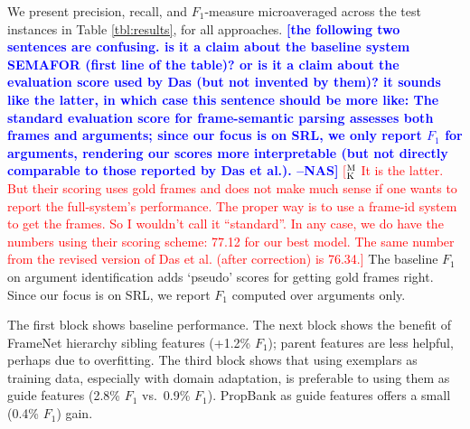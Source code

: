 \documentclass[11pt,a4paper]{article}
\newcommand{\ensuretext}[1]{#1}
\newcommand{\nssmarker}{\ensuretext{\textcolor{magenta}{\ensuremath{^{\textsc{NS}}_{\textsc{S}}}}}}
\newcommand{\mkmarker}{\ensuretext{\textcolor{red}{\ensuremath{^{\textsc{M}}_{\textsc{K}}}}}}
\newcommand{\arkcomment}[3]{\ensuretext{\textcolor{#3}{[#1 #2]}}}
\newcommand{\nss}[1]{\arkcomment{\nssmarker}{#1}{magenta}}
\newcommand{\mk}[1]{\arkcomment{\mkmarker}{#1}{red}}
\newcommand{\nascomment}[1]{\textcolor{blue}{\textbf{\small [#1 --NAS]}}}
\newcommand{\finalversion}[1]{}
\begin{document}



We present precision, recall, and $F_1$-measure microaveraged across the test
instances in Table \ref{tbl:results}, for all approaches. %
\nascomment{the following two sentences  are confusing.  is it a claim about
  the baseline system SEMAFOR (first line of the table)?  or is it a claim
  about the evaluation score used by Das (but not invented by them)?
  it sounds like the latter, in which case this sentence should be
  more like:  The standard evaluation score for frame-semantic parsing
assesses both frames and arguments; since our focus is on SRL, we only
report $F_1$ for arguments, rendering our scores more interpretable
(but not directly comparable to those reported by Das et al.).}
\mk{It is the latter. But their scoring uses gold frames and does not make much 
sense if one wants to report the full-system's performance. The proper
way is to use a frame-id system to get the frames. So I wouldn't call it ``standard''.
In any case, we do have the numbers using their scoring scheme: 77.12 for our best model. 
The same number from the revised version of Das et al. (after correction) is 76.34.}
The baseline $F_1$ on argument identification \citep{das-14} adds `pseudo' scores for getting gold frames right. 
Since our focus is on SRL, we report $F_1$ computed over arguments
only. 

The first block shows baseline performance.  The next block shows the
benefit of FrameNet hierarchy sibling features (+1.2\% $F_1$); parent features
are less helpful, perhaps due to overfitting.  The third block shows
that using exemplars as training data, especially with domain
adaptation, is preferable to using them as guide features (2.8\% $F_1$
vs.~0.9\% $F_1$).  PropBank
as guide features offers a small (0.4\% $F_1$) gain.









\end{document}
